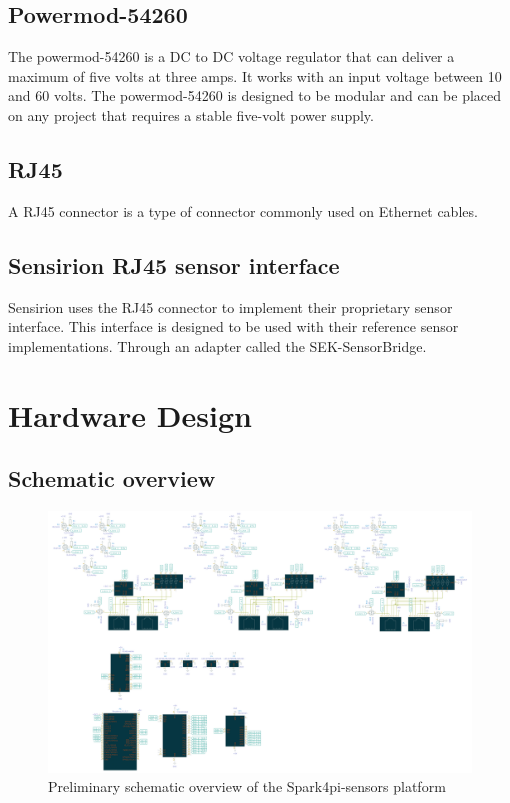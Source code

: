 \documentclass[12pt]{article}
\begin{document}
\subsection{Powermod-54260}
The powermod-54260 is a DC to DC voltage regulator that can deliver a maximum of five volts at three amps.
It works with an input voltage between 10 and 60 volts. The powermod-54260 is designed to be modular and
can be placed on any project that requires a stable five-volt power supply.

\subsection{RJ45}
A RJ45 connector is a type of connector commonly used on Ethernet cables.

\subsection{Sensirion RJ45 sensor interface}
Sensirion uses the RJ45 connector to implement their proprietary sensor interface.
This interface is designed to be used with their reference sensor implementations. Through 
an adapter called the SEK-SensorBridge.

\section{Hardware Design}
\subsection{Schematic overview}
\begin{figure}[H]
    \begin{adjustwidth}{-1.5in}{-1in}
        \centering
        \includegraphics[width=\paperwidth]{spark4pi-sensors-1.png}
        \caption{Preliminary schematic overview of the Spark4pi-sensors platform}
    \end{adjustwidth}
\end{figure}
\end{document}
